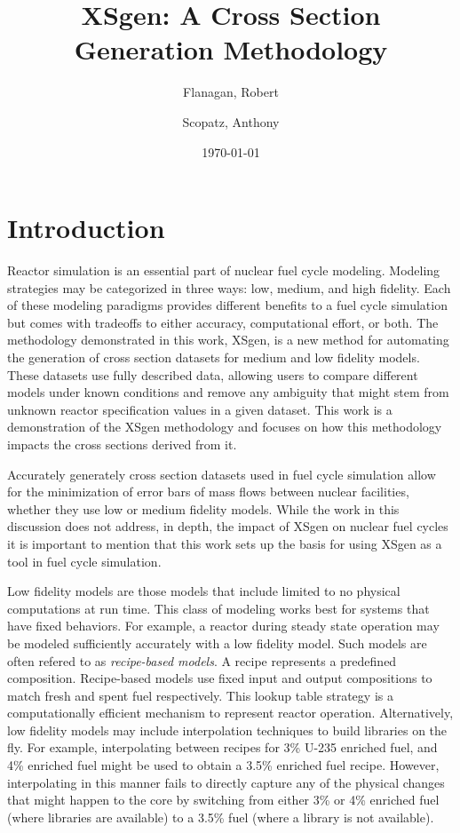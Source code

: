 \documentclass{article}
\begin{document}
\title{XSgen: A Cross Section Generation Methodology}
\date{\today}
\author{Flanagan, Robert \and Scopatz, Anthony}
\maketitle
\onehalfspacing

\section{Introduction}

Reactor simulation is an essential part of nuclear fuel cycle modeling. Modeling strategies
may be categorized in three ways: low, medium, and high fidelity. Each of these modeling
paradigms provides different benefits to a fuel cycle simulation but comes with tradeoffs to
either accuracy, computational effort, or both. The methodology demonstrated in this work, XSgen, 
is a new method for automating the generation of cross section datasets for medium and low fidelity models. 
These datasets use fully described data, allowing users to compare different models under known
conditions and remove any ambiguity that might stem from unknown reactor specification values in a 
given dataset. This work is a demonstration of the XSgen methodology and focuses on how this methodology
impacts the cross sections derived from it. 

Accurately generately cross section datasets used in fuel cycle simulation allow for the minimization
of error bars of mass flows between nuclear facilities, whether they use low or medium fidelity models.
While the work in this discussion does not address, in depth, the impact of XSgen on nuclear fuel cycles 
it is important to mention that this work sets up the basis for using XSgen as a tool in fuel cycle 
simulation.  

Low fidelity models are those models that include limited to no physical computations at run time.
This class of modeling works best for systems that have fixed behaviors. For example, a reactor
during steady state operation may be modeled sufficiently accurately with a low fidelity model.
Such models are often refered to as \emph{recipe-based models}. A recipe represents a predefined
composition. Recipe-based models use fixed input and output compositions to
match fresh and spent
fuel respectively. This lookup table strategy is a computationally efficient mechanism to
represent reactor operation. Alternatively, low fidelity models may include interpolation
techniques to build libraries on the fly. For example, interpolating between recipes for
3\% U-235 enriched fuel, and 4\% enriched fuel might be used to obtain a 3.5\% enriched
fuel recipe.
However, interpolating in this manner fails to directly capture any of the physical changes
that might happen to the core by switching from either 3\% or 4\% enriched fuel (where libraries 
are available) to a 3.5\% fuel (where a library is not available).
\end{document}
